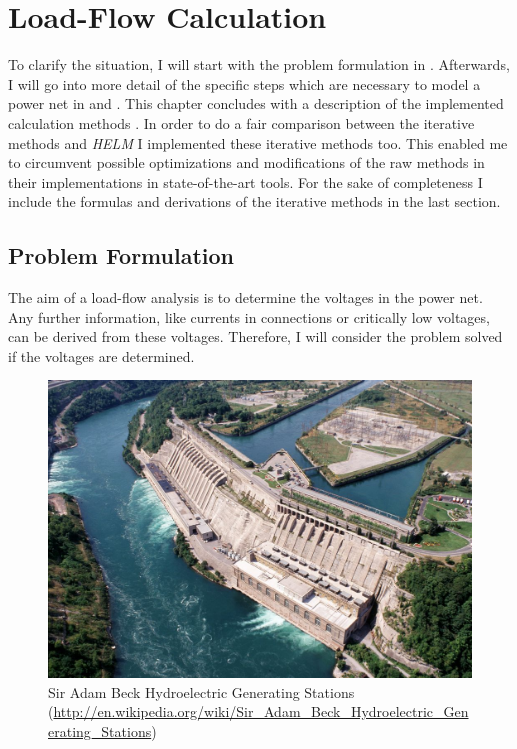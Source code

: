 \chapter{Load-Flow Calculation}

To clarify the situation, I will start with the problem formulation in . Afterwards, I will go into more detail of the specific steps which are necessary to model a power net in  and . This chapter concludes with a description of the implemented calculation methods . In order to do a fair comparison between the iterative methods and \emph{HELM} I implemented these iterative methods too. This enabled me to circumvent possible optimizations and modifications of the raw methods in their implementations in state-of-the-art tools. For the sake of completeness I include the formulas and derivations of the iterative methods in the last section.

\section{Problem Formulation}
\label{sec:problem_formulation}

The aim of a load-flow analysis is to determine the voltages in the power net. Any further information, like currents in connections or critically low voltages, can be derived from these voltages. Therefore, I will consider the problem solved if the voltages are determined.

\begin{figure}
	\includegraphics[width=\textwidth]{figures/adam_beck_complex.jpg}
	\caption[Sir Adam Beck Hydroelectric Generating Stations]{Sir Adam Beck Hydroelectric Generating Stations (\small{\url{http://en.wikipedia.org/wiki/Sir_Adam_Beck_Hydroelectric_Generating_Stations}})}
	\label{fig:power_plant}
\end{figure}

